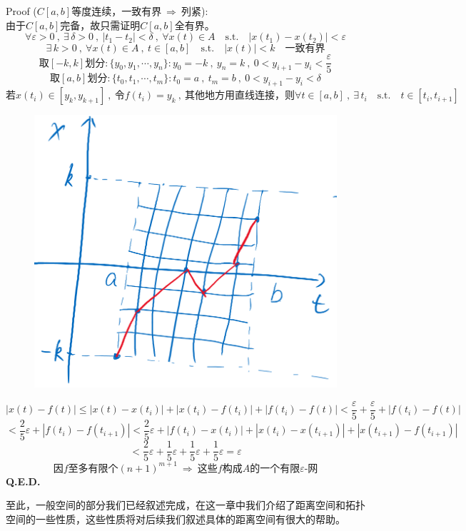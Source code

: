 Proof ($C[a,b]$等度连续，一致有界$ \ \Rightarrow \ $列紧):\\
由于$C[a,b]$完备，故只需证明$C[a,b]$全有界。
\[\forall \varepsilon>0 \ , \ \exists \, \delta>0 \ , \ |t_1-t_2|<\delta \ , \ \forall x(t) \in A \quad \text{s.t.} \quad |x(t_1)-x(t_2)|<\varepsilon\]
\[\exists \, k>0 \ , \ \forall x(t) \in A \ , \ t \in [a,b] \quad \text{s.t.} \quad |x(t)|<k \quad \text{一致有界}\]
\[\text{取$[-k,k]$划分}:\{y_0,y_1,\cdots,y_n\}:y_0=-k \ , \ y_n=k \ , \ 0<y_{i+1}-y_i<\frac{\varepsilon}{5}\]
\[\text{取$[a,b]$划分}:\{t_0,t_1,\cdots,t_m\}:t_0=a \ , \ t_m=b \ , \ 0<y_{i+1}-y_i<\delta\]
\[\text{若}x(t_i) \in [y_k,y_{k+1}] \ , \ \text{令}f(t_i)=y_k \ , \ \text{其他地方用直线连接，则}\forall t \in [a,b] \ , \ \exists \, t_i \quad \text{s.t.} \quad t \in [t_i,t_{i+1}]\]
\begin{figure}[htbp]
    \center
    \includegraphics[scale=0.3]{./fig/2.2.3-2.png}
\end{figure}
\[|x(t)-f(t)| \leq |x(t)-x(t_i)|+|x(t_i)-f(t_i)|+|f(t_i)-f(t)|<\frac{\varepsilon}{5}+\frac{\varepsilon}{5}+|f(t_i)-f(t)|\]
\[<\frac{2}{5}\varepsilon+|f(t_i)-f(t_{i+1})|<\frac{2}{5}\varepsilon+|f(t_i)-x(t_i)|+|x(t_i)-x(t_{i+1})|+|x(t_{i+1})-f(t_{i+1})|\]
\[<\frac{2}{5}\varepsilon+\frac{1}{5}\varepsilon+\frac{1}{5}\varepsilon+\frac{1}{5}\varepsilon=\varepsilon\]
\[\text{因$f$至多有限个}(n+1)^{m+1} \ \Rightarrow \ \text{这些$f$构成$A$的一个有限$\varepsilon$-网}\]
\textbf{Q.E.D.}

至此，一般空间的部分我们已经叙述完成，在这一章中我们介绍了距离空间和拓扑空间的一些性质，这些性质将对后续我们叙述具体的距离空间有很大的帮助。